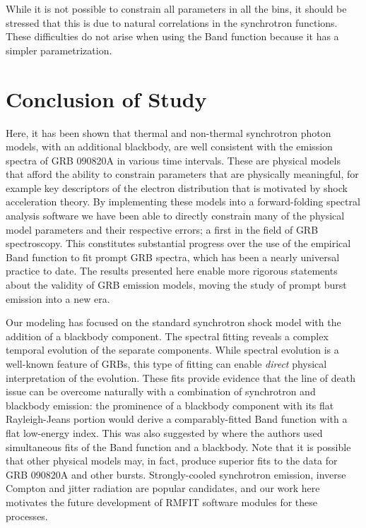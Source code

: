 While it is not possible to constrain all parameters in all the bins,
it should be stressed that this is due to natural correlations in the
synchrotron functions. These difficulties do not arise when using the
Band function because it has a simpler parametrization.


\section{Conclusion of Study}
%

Here, it has been shown that thermal and non-thermal synchrotron
photon models, with an additional blackbody, are well consistent with
the emission spectra of GRB 090820A in various time intervals. These
are physical models that afford the ability to constrain parameters
that are physically meaningful, for example key descriptors of the
electron distribution that is motivated by shock acceleration
theory. By implementing these models into a forward-folding spectral
analysis software we have been able to directly constrain many of the
physical model parameters and their respective errors; a first in the
field of GRB spectroscopy. This constitutes substantial progress over
the use of the empirical Band function to fit prompt GRB spectra,
which has been a nearly universal practice to date.  The results
presented here enable more rigorous statements about the validity of
GRB emission models, moving the study of prompt burst emission into a
new era.

Our modeling has focused on the standard synchrotron shock model with
the addition of a blackbody component. The spectral fitting reveals a
complex temporal evolution of the separate components. While spectral
evolution is a well-known feature of GRBs, this type of fitting can
enable \textit{direct} physical interpretation of the evolution. These
fits provide evidence that the line of death issue
\cite{preece:1998,Preece:2002} can be overcome naturally with a
combination of synchrotron and blackbody emission: the prominence of a
blackbody component with its flat Rayleigh-Jeans portion would derive
a comparably-fitted Band function with a flat low-energy index. This
was also suggested by \cite{Guiriec:2011} where the authors used
simultaneous fits of the Band function and a blackbody. Note that it
is possible that other physical models may, in fact, produce superior
fits to the data for GRB 090820A and other bursts. Strongly-cooled
synchrotron emission, inverse Compton and jitter radiation are popular
candidates, and our work here motivates the future development of
RMFIT software modules for these processes.

